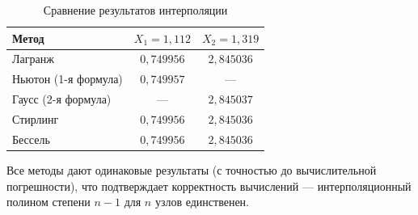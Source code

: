 \begin{table}[h!]
\centering
\label{tab:results}
\renewcommand{\arraystretch}{1.5}
\begin{tabular}{|l|c|c|}
\hline
\textbf{Метод} & \textbf{$X_1 = 1{,}112$} & \textbf{$X_2 = 1{,}319$} \\
\hline
Лагранж & $0{,}749956$ & $2{,}845036$ \\
Ньютон (1-я формула) & $0{,}749957$ & — \\
Гаусс (2-я формула) & — & $2{,}845037$ \\
Стирлинг & $0{,}749956$ & $2{,}845036$ \\
Бессель & $0{,}749956$ & $2{,}845036$ \\
\hline
\end{tabular}
\caption{Сравнение результатов интерполяции}
\end{table}

Все методы дают одинаковые результаты (с точностью до вычислительной погрешности), что подтверждает корректность вычислений — интерполяционный полином степени $n-1$ для $n$ узлов единственен.
